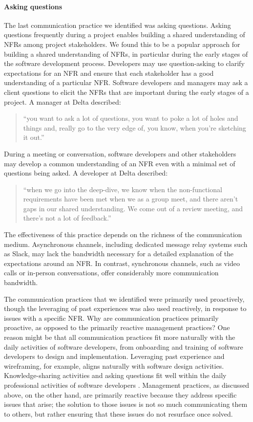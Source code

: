 \documentclass[smallextended]{svjour3}
\begin{document}
\paragraph{Asking questions} The last communication practice we identified was asking questions. 
Asking questions frequently during a project enables building a shared understanding of NFRs among project stakeholders. 
We found this to be a popular approach for building a shared understanding of NFRs, in particular during the early stages of the software development process. 
Developers may use question-asking to clarify expectations for an NFR and ensure that each stakeholder has a good understanding of a particular NFR. 
Software developers and managers may ask a client questions to elicit the NFRs that are important during the early stages of a project. A manager at Delta described:
\begin{quote}
    ``you want to ask a lot of questions, you want to poke a lot of holes and things and, really go to the very edge of, you know, when you’re sketching it out.''
\end{quote}
During a meeting or conversation, software developers and other stakeholders may develop a common understanding of an NFR even with a minimal set of questions being asked.
A developer at Delta described:
\begin{quote}
    ``when we go into the deep-dive, we know when the non-functional requirements have been met when we as a group meet, and there aren’t gaps in our shared understanding. We come out of a review meeting, and there’s not a lot of feedback.''
\end{quote}    
%
The effectiveness of this practice 
depends on the richness of the communication medium.
Asynchronous channels, including dedicated message relay systems such as Slack, may lack the bandwidth necessary for a detailed explanation of the expectations around an NFR.  
In contrast, synchronous channels, such as video calls or in-person conversations, offer considerably more communication bandwidth.


The communication practices that we identified were primarily used proactively, though the leveraging of past experiences was also used reactively, in response to issues with a specific NFR. Why are communication practices primarily proactive, as opposed to the primarily reactive management practices? 
One reason might be that all communication practices fit more naturally with the daily activities of software developers, from onboarding and training of software developers to design and implementation. Leveraging past experience and wireframing, for example, aligns naturally with software design activities. Knowledge-sharing activities and asking questions fit well within the daily professional activities of software developers \citep{meyer2019today,kautz2008knowledge}.
Management practices, as discussed above, on the other hand, are primarily reactive because they address specific issues that arise; the solution to those issues is not so much communicating them to others, but rather ensuring that these issues do not resurface once solved.
\end{document}
